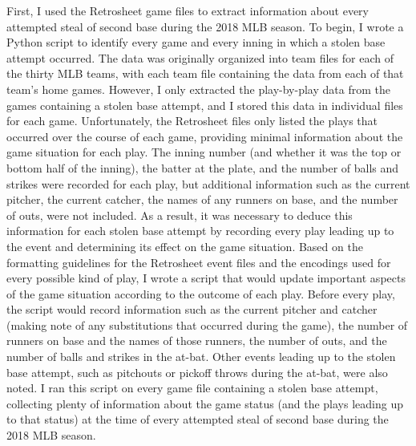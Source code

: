 \documentclass{article}
\begin{document}
First, I used the Retrosheet game files to extract information about every attempted steal of second base during the 2018 MLB season. To begin, I wrote a Python script to identify every game and every inning in which a stolen base attempt occurred. The data was originally organized into team files for each of the thirty MLB teams, with each team file containing the data from each of that team’s home games. However, I only extracted the play-by-play data from the games containing a stolen base attempt, and I stored this data in individual files for each game. Unfortunately, the Retrosheet files only listed the plays that occurred over the course of each game, providing minimal information about the game situation for each play. The inning number (and whether it was the top or bottom half of the inning), the batter at the plate, and the number of balls and strikes were recorded for each play, but additional information such as the current pitcher, the current catcher, the names of any runners on base, and the number of outs, were not included. As a result, it was necessary to deduce this information for each stolen base attempt by recording every play leading up to the event and determining its effect on the game situation. Based on the formatting guidelines for the Retrosheet event files and the encodings used for every possible kind of play, I wrote a script that would update important aspects of the game situation according to the outcome of each play. Before every play, the script would record information such as the current pitcher and catcher (making note of any substitutions that occurred during the game), the number of runners on base and the names of those runners, the number of outs, and the number of balls and strikes in the at-bat. Other events leading up to the stolen base attempt, such as pitchouts or pickoff throws during the at-bat, were also noted. I ran this script on every game file containing a stolen base attempt, collecting plenty of information about the game status (and the plays leading up to that status) at the time of every attempted steal of second base during the 2018 MLB season.
\end{document}
